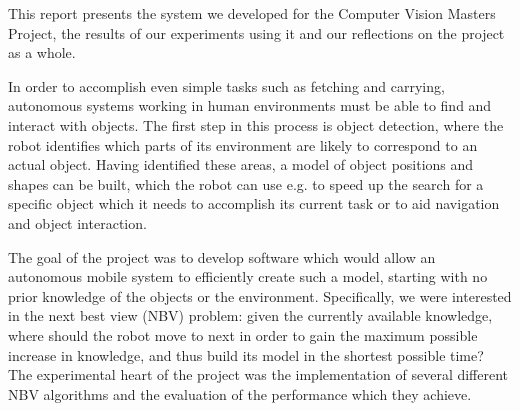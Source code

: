 

This report presents the system we developed for the Computer Vision Masters Project, the results of our experiments using it and our reflections on the project as a whole.

In order to accomplish even simple tasks such as fetching and carrying, autonomous systems working in human environments must be able to find and interact with objects.
The first step in this process is object detection, where the robot identifies which parts of its environment are likely to correspond to an actual object.
Having identified these areas, a model of object positions and shapes can be built, which the robot can use e.g. to speed up the search for a specific object which it needs to accomplish its current task or to aid navigation and object interaction.

The goal of the project was to develop software which would allow an autonomous mobile system to efficiently create such a model, starting with no prior knowledge of the objects or the environment.
Specifically, we were interested in the next best view (NBV) problem: given the currently available knowledge, where should the robot move to next in order to gain the maximum possible increase in knowledge, and thus build its model in the shortest possible time?
The experimental heart of the project was the implementation of several different NBV algorithms and the evaluation of the performance which they achieve.



